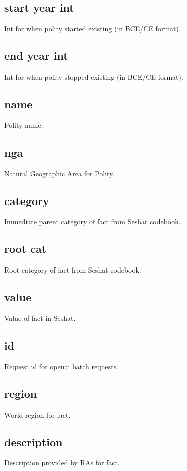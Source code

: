 \documentclass[11pt]{article}
\begin{document}
\subsection*{start year int}
\label{sec:org82c52b0}
Int for when polity started existing (in BCE/CE format).
\subsection*{end year int}
\label{sec:orgb2d26c2}
Int for when polity stopped existing (in BCE/CE format).
\subsection*{name}
\label{sec:orge1647f3}
Polity name.
\subsection*{nga}
\label{sec:org62519a4}
Natural Geographic Area for Polity.
\subsection*{category}
\label{sec:org9c0e955}
Immediate parent category of fact from Seshat codebook.
\subsection*{root cat}
\label{sec:org933e1c9}
Root category of fact from Seshat codebook.
\subsection*{value}
\label{sec:org4c2ad4b}
Value of fact in Seshat.
\subsection*{id}
\label{sec:org38ec6f5}
Request id for openai batch requests.
\subsection*{region}
\label{sec:orgcad9f31}
World region for fact.
\subsection*{description}
\label{sec:org9e116af}
Description provided by RAs for fact.
\end{document}
